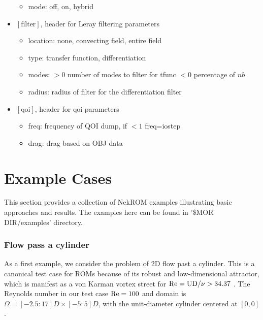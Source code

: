 \begin{itemize}
   \begin{itemize}
      \item mode: off, on, hybrid
   \end{itemize}
\item $[\text{filter}]$, header for Leray filtering parameters \cite{kaneko2020towards}\cite{tsai2022parametric}
   \begin{itemize}
      \item location: none, convecting field, entire field
      \item type: transfer function, differentiation
      \item modes: $>0$ number of modes to filter for tfunc $<0$ percentage of $nb$
      \item radius: radius of filter for the differentiation filter 
   \end{itemize}
\item $[\text{qoi}]$, header for qoi parameters
   \begin{itemize}
    \item freq: frequency of QOI dump, if $<1$ freq=iostep
    \item drag: drag based on OBJ data
   \end{itemize}
\end{itemize}

\section{Example Cases}
This section provides a collection of NekROM examples illustrating basic approaches and results. The examples here can be found in '\$MOR DIR/examples' directory.

\subsubsection{Flow pass a cylinder}
As a first example, we consider the problem of 2D flow past a cylinder. This is
a canonical test case for ROMs because of its robust and low-dimensional
attractor, which is manifest as a von Karman vortex street for $\rm Re = UD/\nu
>34.37$ \cite{ding2021flow}. The Reynolds number in our test case $\rm
Re = 100$ and domain is $\Omega = [-2.5 : 17]D \times [-5 : 5]D$, with the
unit-diameter cylinder centered at $[0, 0]$.

